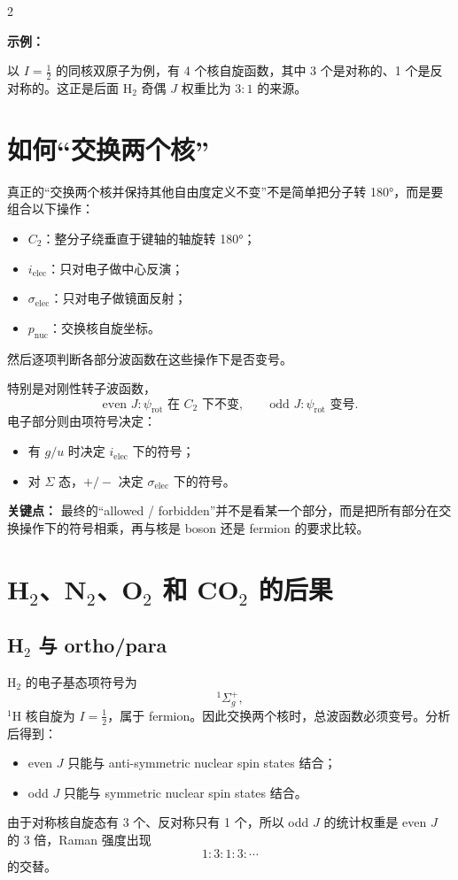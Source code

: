 \documentclass[a4paper,9pt]{article}
\newenvironment{keypoint}
{\par\vspace{0.3em}\noindent\begin{tcolorbox}[colback=keybg,colframe=keycolor,boxrule=0.5pt,arc=2pt,left=2pt,right=2pt,top=2pt,bottom=2pt,boxsep=0pt]\noindent\textcolor{keycolor}{\textbf{关键点：}}}
{\end{tcolorbox}\par\vspace{0.3em}}
\newenvironment{examplebox}
{\par\vspace{0.3em}\noindent\begin{tcolorbox}[colback=boxbg,colframe=derivcolor,boxrule=0.5pt,arc=2pt,left=2pt,right=2pt,top=2pt,bottom=2pt,boxsep=0pt]\scriptsize\noindent\textcolor{derivcolor}{\textbf{示例：}}\par\setlength{\parskip}{0.1ex}\setlength{\itemsep}{0pt}\setlength{\parsep}{0pt}}
{\end{tcolorbox}\par\vspace{0.3em}}
\begin{document}
\begin{multicols}{2}
	\begin{examplebox}
		以 $I=\frac12$ 的同核双原子为例，有 4 个核自旋函数，其中 3 个是对称的、1 个是反对称的。这正是后面 H$_2$ 奇偶 $J$ 权重比为 $3:1$ 的来源。
	\end{examplebox}

	\section{如何“交换两个核”}

	真正的“交换两个核并保持其他自由度定义不变”不是简单把分子转 180°，而是要组合以下操作：
	\begin{itemize}
		\item $C_2$：整分子绕垂直于键轴的轴旋转 180°；
		\item $i_{\mathrm{elec}}$：只对电子做中心反演；
		\item $\sigma_{\mathrm{elec}}$：只对电子做镜面反射；
		\item $p_{\mathrm{nuc}}$：交换核自旋坐标。
	\end{itemize}
	然后逐项判断各部分波函数在这些操作下是否变号。

	特别是对刚性转子波函数，
	\[
		\text{even }J: \psi_{\mathrm{rot}} \text{ 在 }C_2\text{ 下不变},
		\qquad
		\text{odd }J: \psi_{\mathrm{rot}} \text{ 变号}.
	\]
	电子部分则由项符号决定：
	\begin{itemize}
		\item 有 $g/u$ 时决定 $i_{\mathrm{elec}}$ 下的符号；
		\item 对 $\Sigma$ 态，$+/-$ 决定 $\sigma_{\mathrm{elec}}$ 下的符号。
	\end{itemize}

	\begin{keypoint}
		最终的“allowed / forbidden”并不是看某一个部分，而是把所有部分在交换操作下的符号相乘，再与核是 boson 还是 fermion 的要求比较。
	\end{keypoint}

	\section{H$_2$、N$_2$、O$_2$ 和 CO$_2$ 的后果}

	\subsection{H$_2$ 与 ortho/para}
	H$_2$ 的电子基态项符号为
	\[
		{}^1\Sigma_g^+,
	\]
	$^1$H 核自旋为 $I=\frac12$，属于 fermion。因此交换两个核时，总波函数必须变号。分析后得到：
	\begin{itemize}
		\item even $J$ 只能与 anti-symmetric nuclear spin states 结合；
		\item odd $J$ 只能与 symmetric nuclear spin states 结合。
	\end{itemize}
	由于对称核自旋态有 3 个、反对称只有 1 个，所以 odd $J$ 的统计权重是 even $J$ 的 3 倍，Raman 强度出现
	\[
		1:3:1:3:\cdots
	\]
	的交替。


\end{multicols}
\end{document}
